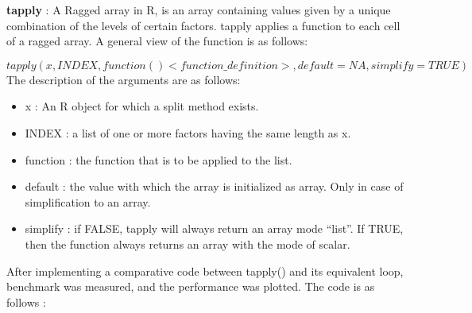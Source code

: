 \documentclass{article}
\begin{document}
	\textbf{tapply} :
	A Ragged array in R, is an array containing values given by a unique combination of the levels of certain factors. tapply applies a function to each cell of a ragged array. A general view of the function is as follows:
	
	$$tapply(x, INDEX, function(){<function\_definition>}, default = NA, simplify = TRUE)$$
	The description of the arguments are as follows:\leavevmode\newline
	
	\begin{itemize}
	\item	x : An R object for which a split method exists.
	\item	INDEX : a list of one or more factors having the same length as x.
	\item	function : the function that is to be applied to the list.
	\item	default : the value with which the array is initialized as array. Only in case of simplification to an array.
	\item	simplify : if FALSE, tapply will always return an array mode “list”. If TRUE, then the function always returns an array with the mode of scalar.
	
\end{itemize}
	After implementing a comparative code between tapply() and its equivalent loop, benchmark was measured, and the performance was plotted. The code is as follows :
	
	\lstset{language=R}
	
\end{document}

